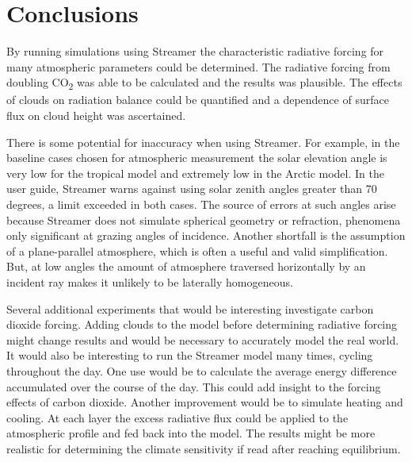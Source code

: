 \documentclass[twocol]{ametsoc}
\begin{document}
\section{Conclusions}
By running simulations using Streamer the characteristic radiative forcing for many atmospheric parameters could be determined.
The radiative forcing from doubling CO\textsubscript{2} was able to be calculated and the results was plausible.
The effects of clouds on radiation balance could be quantified and a dependence of surface flux on cloud height was ascertained.
\par There is some potential for inaccuracy when using Streamer.
For example, in the baseline cases chosen for atmospheric measurement the solar elevation angle is very low for the tropical model and extremely low in the Arctic model.
In the user guide, Streamer warns against using solar zenith angles greater than 70 degrees, a limit exceeded in both cases.
The source of errors at such angles arise because Streamer does not simulate spherical geometry or refraction, phenomena only significant at grazing angles of incidence.
Another shortfall is the assumption of a plane-parallel atmosphere, which is often a useful and valid simplification.
But, at low angles the amount of atmosphere traversed horizontally by an incident ray makes it unlikely to be laterally homogeneous.
\par Several additional experiments that would be interesting investigate carbon dioxide forcing.
Adding clouds to the model before determining radiative forcing might change results and would be necessary to accurately model the real world.
It would also be interesting to run the Streamer model many times, cycling throughout the day.
One use would be to calculate the average energy difference accumulated over the course of the day. This could add insight to the forcing effects of carbon dioxide.
Another improvement would be to simulate heating and cooling.
At each layer the excess radiative flux could be applied to the atmospheric profile and fed back into the model.
The results might be more realistic for determining the climate sensitivity if read after reaching equilibrium.
\clearpage

%
\end{document}
